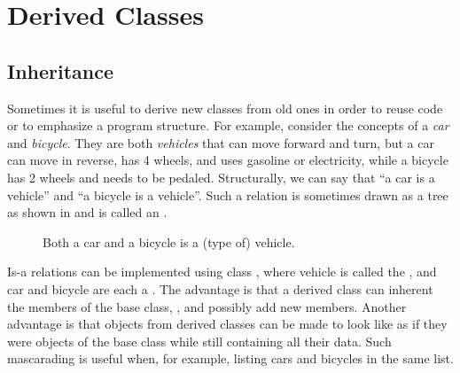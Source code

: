 \documentclass[fsharpnotes.tex]{subfiles}
\begin{document}
\chapter{Derived Classes}
\label{chap:derivedClasses}
\section{Inheritance}
\label{sec:inheritance}
Sometimes it is useful to derive new classes from old ones in order to reuse code or to emphasize a program structure. For example, consider the concepts of a \emph{car} and \emph{bicycle}. They are both \emph{vehicles} that can move forward and turn, but a car can move in reverse, has 4 wheels, and uses gasoline or electricity, while a bicycle has 2 wheels and needs to be pedaled. Structurally, we can say that ``a car is a vehicle'' and ``a bicycle is a vehicle''. Such a relation is sometimes drawn as a tree as shown in  and is called an .
%
\begin{figure}
  \centering
  \caption{Both a car and a bicycle is a (type of) vehicle.}
  \label{fig:inheritanceVehicle}
\end{figure}
%
Is-a relations can be implemented using class , where vehicle is called the , and car and bicycle are each a . The advantage is that a derived class can inherent the members of the base class, , and possibly add new members. Another advantage is that objects from derived classes can be made to look like as if they were objects of the base class while still containing all their data. Such mascarading is useful when, for example, listing cars and bicycles in the same list.
\end{document}
